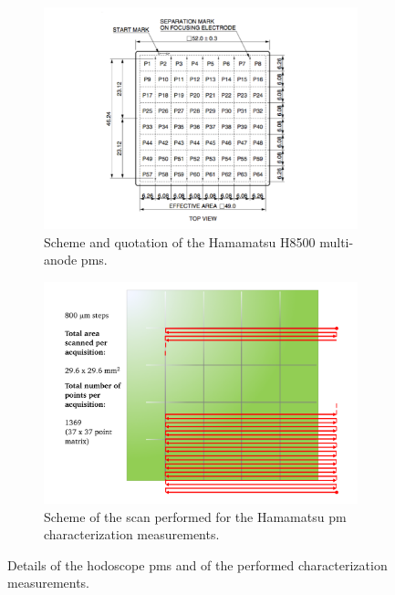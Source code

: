 \begin{figure}
\begin{subfigure}[t]{.5\textwidth}
\centering
\includegraphics[width=1\textwidth]{03_GraphicFiles/chapter3_CLaRySproto/Hodoscope/PM_specs_mod.pdf}
\caption{Scheme and quotation of the Hamamatsu H8500 multi-anode \glspl{pm}.}
\label{chap3::fig::hodoPMscheme}
\end{subfigure}
\begin{subfigure}[t]{.5\textwidth}
\centering
\includegraphics[width=1\textwidth]{03_GraphicFiles/chapter3_CLaRySproto/Hodoscope/scan_logic.pdf}
\caption{Scheme of the scan performed for the Hamamatsu \gls{pm} characterization measurements.}
\label{chap3::fig::hodoPMscanScheme}
\end{subfigure}
\caption{Details of the hodoscope \glspl{pm} and of the performed characterization measurements.}
\label{chap3::fig::hodoScanDetails}
\end{figure}

